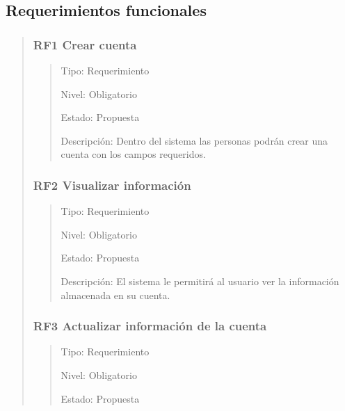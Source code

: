 \documentclass[14pt]{article}
\begin{document}
        \subsection{Requerimientos funcionales}
            \begin{quote}
                \subsubsection{RF1 Crear cuenta}\label{RF1 Crear cuenta}
                    \begin{quote}
                        Tipo: Requerimiento
                        
                        Nivel: Obligatorio
                        
                        Estado: Propuesta
                        
                        Descripción: Dentro del sistema las personas podrán crear una cuenta con los campos requeridos.
                    \end{quote}
                \subsubsection{RF2 Visualizar información}\label{RF2 Visualizar información}
                    \begin{quote}
                        Tipo: Requerimiento
                        
                        Nivel: Obligatorio
                        
                        Estado: Propuesta
                        
                        Descripción: El sistema le permitirá al usuario ver la información almacenada en su cuenta.
                    \end{quote}
                \subsubsection{RF3 Actualizar información de la cuenta}\label{RF3 Actualizar información de la cuenta}
                    \begin{quote}
                        Tipo: Requerimiento
                        
                        Nivel: Obligatorio
                        
                        Estado: Propuesta
                        

\end{quote}
\end{quote}
\end{document}
